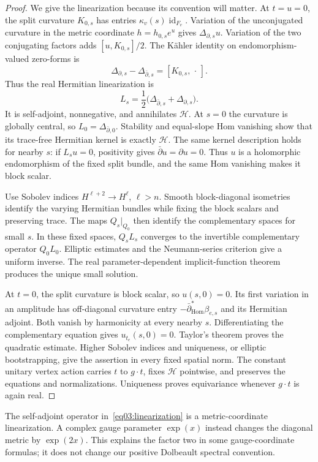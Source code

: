\documentclass[11pt]{amsart}
\theoremstyle{definition}
\theoremstyle{remark}
\newcommand{\db}{\bar\partial}
\newcommand{\Hom}{\operatorname{Hom}}
\newcommand{\id}{\operatorname{id}}
\newcommand{\HH}{\mathcal H}
\begin{document}
\begin{proof}
We give the linearization because its convention will matter.
At \(t=u=0\), the split curvature \(K_{0,s}\) has entries
\(\kappa_v(s)\id_{F_v}\). Variation of the unconjugated
curvature in the metric coordinate \(h=h_{0,s}e^u\) gives
\(\Delta_{\partial,s}u\). Variation of the two conjugating
factors adds \([u,K_{0,s}]/2\). The Kähler identity on
endomorphism-valued zero-forms is
\[
 \Delta_{\partial,s}-\Delta_{\db,s}=[K_{0,s},\,\cdot\,].
\]
Thus the real Hermitian linearization is
\begin{equation}\label{eq03:linearization}
 L_s=\frac12\bigl(\Delta_{\db,s}+\Delta_{\partial,s}\bigr).
\end{equation}
It is self-adjoint, nonnegative, and annihilates \(\HH\).
At \(s=0\) the curvature is globally central, so
\(L_0=\Delta_{\db,0}\). Stability and equal-slope Hom
vanishing show that its trace-free Hermitian kernel is
exactly \(\HH\). The same kernel description holds for nearby
\(s\): if \(L_su=0\), positivity gives \(\db u=\partial u=0\).
Thus \(u\) is a holomorphic endomorphism of the fixed split bundle,
and the same Hom vanishing makes it block scalar.

Use Sobolev indices \(H^{\ell+2}\to H^\ell\), \(\ell>n\).
Smooth block-diagonal isometries identify the varying Hermitian
bundles while fixing the block scalars and preserving trace.
The maps \(Q_s|_{Q_0}\) then identify the complementary spaces
for small \(s\). In these fixed spaces, \(Q_sL_s\) converges
to the invertible complementary operator \(Q_0L_0\).
Elliptic estimates and the Neumann-series criterion give a
uniform inverse. The real parameter-dependent implicit-function
theorem produces the unique small solution.

At \(t=0\), the split curvature is block scalar, so \(u(s,0)=0\).
Its first variation in an amplitude has off-diagonal curvature
entry \(-\db^*_{\Hom}\beta_{e,s}\) and its Hermitian adjoint.
Both vanish by harmonicity at every nearby \(s\). Differentiating
the complementary equation gives \(u_{t_e}(s,0)=0\).
Taylor's theorem proves the quadratic estimate. Higher Sobolev
indices and uniqueness, or elliptic bootstrapping, give the
assertion in every fixed spatial norm.
The constant unitary vertex action carries \(t\) to \(g\cdot t\),
fixes \(\HH\) pointwise, and preserves the equations and
normalizations. Uniqueness proves equivariance whenever
\(g\cdot t\) is again real.
\end{proof}

The self-adjoint operator in~\eqref{eq03:linearization} is a
metric-coordinate linearization. A complex gauge parameter
\(\exp(x)\) instead changes the diagonal metric by \(\exp(2x)\).
This explains the factor two in some gauge-coordinate formulas;
it does not change our positive Dolbeault spectral convention.
\end{document}
